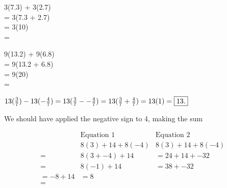 \documentclass[12pt]{article}
\newenvironment{problem}[2][Problem]{\begin{trivlist}
\item[\hskip \labelsep {\bfseries #1}\hskip \labelsep {\bfseries #2.}]}{\end{trivlist}}
\begin{document}
\begin{problem}{13}
3(7.3) + 3(2.7) \\
= 3(7.3 + 2.7) \\
= 3(10) \\
= 
\end{problem}

\begin{problem}{15}
9(13.2) + 9(6.8) \\
= 9(13.2 + 6.8) \\
= 9(20) \\
= 
\end{problem}

\begin{problem}{17}
$13(\frac{3}{7}) - 13(-\frac{4}{7}) \\
=13(\frac{3}{7} - -\frac{4}{7}) \\
=13(\frac{3}{7} + \frac{4}{7}) \\
=13(1) \\
=\boxed{13.}$
\end{problem}

\begin{problem}{19}
We should have applied the negative sign to 4, making the sum 
\end{problem}

\begin{problem}{21}
\begin{align*}
    &\text{Equation 1} &\text{Equation 2} \\
    &8(3) + 14 + 8(-4)  &8(3) + 14 + 8(-4) \\
    = &8(3 + -4) + 14 &= 24 + 14 + -32 \\
    = &8(-1) + 14 &= 38 + -32 \\
    = -8 + 14 &= 8 \\
    = 
\end{align*}
\end{problem}
\end{document}

